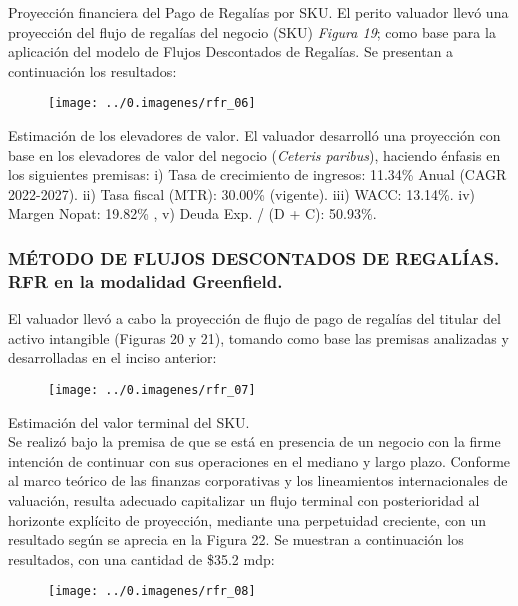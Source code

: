 \begin{leftcolumn}
{\textcolor{principal}{Proyección financiera del Pago de Regalías por SKU.}  El perito valuador llevó  una proyección del flujo de regalías del negocio (SKU) \textcolor{principal}{\textit{Figura 19}}; como base para la aplicación del modelo de Flujos Descontados de Regalías.  Se presentan a continuación los resultados:\\

\begin{figure}
\centering
\texttt{[image: ../0.imagenes/rfr\_06]}
\end{figure}

\textcolor{principal}{Estimación de los elevadores de valor.} El valuador desarrolló una proyección con base en los elevadores de valor del negocio (\textit{Ceteris paribus}), haciendo énfasis en los siguientes premisas: i) Tasa de crecimiento de ingresos: 11.34\% Anual (CAGR 2022-2027). ii) Tasa fiscal (MTR): 30.00\% (vigente).  iii) WACC: 13.14\%. iv) Margen Nopat: 19.82\% , v) Deuda Exp. / (D + C): 50.93\%. \\

\subsubsection{MÉTODO DE FLUJOS DESCONTADOS DE REGALÍAS. RFR en la modalidad Greenfield.}

 El valuador llevó a cabo la proyección de flujo de pago de regalías del titular del activo intangible (Figuras 20 y 21), tomando como base las premisas analizadas y desarrolladas en el inciso anterior:
 
 \begin{figure}
\centering
\texttt{[image: ../0.imagenes/rfr\_07]}
\end{figure}

\textcolor{principal}{Estimación del valor terminal del SKU.}\\

Se realizó bajo la premisa de que se está en presencia de un negocio con la firme intención de continuar con sus operaciones en el mediano y largo plazo. Conforme al marco teórico de las finanzas corporativas y los lineamientos internacionales de valuación, resulta adecuado capitalizar un flujo terminal  con posterioridad al horizonte explícito de proyección, mediante una perpetuidad creciente, con un resultado según se aprecia en la Figura 22. Se muestran a continuación los resultados, con una cantidad de \$35.2 mdp:

 \begin{figure}
\centering
\texttt{[image: ../0.imagenes/rfr\_08]}
\end{figure}

}
\end{leftcolumn}
